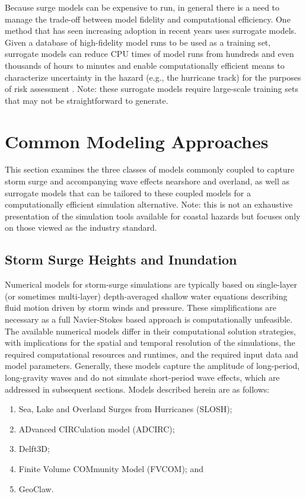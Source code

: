 Because surge models can be expensive to run, in general there is a need to manage the trade-off between model fidelity and computational efficiency. One method that has seen increasing adoption in recent years uses surrogate models. Given a database of high-fidelity model runs to be used as a training set, surrogate models can reduce CPU times of model runs from hundreds and even thousands of hours to minutes and enable computationally efficient means to characterize uncertainty in the hazard (e.g., the hurricane track) for the purposes of risk assessment \citep{kijewski-correa2014cybereye}. Note: these surrogate models require large-scale training sets that may not be straightforward to generate. 

\section{Common Modeling Approaches}
\label{sec:storm_surge_methods}

This section examines the three classes of models commonly coupled to capture storm surge and accompanying wave effects nearshore and overland, as well as surrogate models that can be tailored to these coupled models for a computationally efficient simulation alternative. Note: this is not an exhaustive presentation of the simulation tools available for coastal hazards but focuses only on those viewed as the industry standard. 

\subsection{Storm Surge Heights and Inundation}

Numerical models for storm-surge simulations are typically based on single-layer (or sometimes multi-layer) depth-averaged shallow water equations describing fluid motion driven by storm winds and pressure. These simplifications are necessary as a full Navier-Stokes based approach is computationally unfeasible. The available numerical models differ in their computational solution strategies, with implications for the spatial and temporal resolution of the simulations, the required computational resources and runtimes, and the required input data and model parameters. Generally, these models capture the amplitude of long-period, long-gravity waves and do not simulate short-period wave effects, which are addressed in subsequent sections. Models described herein are as follows:

\begin{enumerate}
    \item Sea, Lake and Overland Surges from Hurricanes  (SLOSH);
    \item ADvanced CIRCulation model (ADCIRC);
    \item Delft3D;
    \item Finite Volume COMmunity Model (FVCOM); and
    \item GeoClaw.
\end{enumerate}


